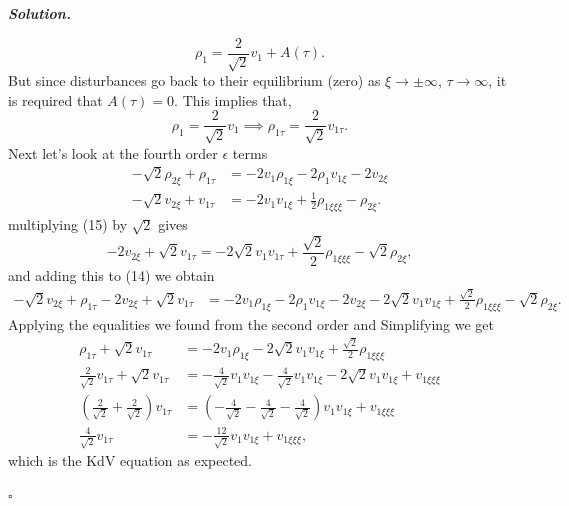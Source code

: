 \documentclass[12pt]{report}
\newenvironment{solution}[1][\it{Solution}]{\textbf{#1. } }{$\square$}
\def\eps{{\epsilon}}
\newcommand{\paren}[1]{{\left(#1\right)}} %
\begin{document}
\begin{solution}
\begin{enumerate}
        \[
            \rho_1 = \frac{2}{\sqrt{2}}v_1 + A(\tau).
        \]
        But since disturbances go back to their equilibrium (zero) as $\xi \to \pm \infty$, $\tau \to \infty$, it is required that $A(\tau) = 0$. This implies that,
        \[
            \rho_1 = \frac{2}{\sqrt{2}} v_1 \implies \rho_{1\tau} = \frac{2}{\sqrt{2}}v_{1\tau}.
        \]
        Next let's look at the fourth order $\eps$ terms
        \begin{align}
            -\sqrt{2}\rho_{2\xi} + \rho_{1\tau} &= -2v_1\rho_{1\xi} - 2\rho_1v_{1\xi} - 2 v_{2\xi}\\
            -\sqrt{2}v_{2\xi} + v_{1\tau} &= -2v_1v_{1\xi} + \frac{1}{2}\rho_{1\xi\xi\xi} - \rho_{2\xi}.
        \end{align}
        multiplying (15) by $\sqrt{2}$ gives
        \[
            -2v_{2\xi} + \sqrt{2}v_{1\tau} = -2\sqrt{2}v_1v_{1\tau} + \frac{\sqrt{2}}{2}\rho_{1\xi\xi\xi} - \sqrt{2}\rho_{2\xi},
         \]
        and adding this to (14) we obtain
        \begin{align*}
            -\sqrt{2}v_{2\xi} + \rho_{1\tau} - 2v_{2\xi} + \sqrt{2}v_{1\tau} &= -2 v_1\rho_{1\xi} - 2\rho_1v_{1\xi} - 2v_{2\xi} -2\sqrt{2}v_1v_{1\xi} + \frac{\sqrt{2}}{2}\rho_{1\xi\xi\xi} - \sqrt{2}\rho_{2\xi}.
        \end{align*}
        Applying the equalities we found from the second order and Simplifying we get
        \begin{align*}
            \rho_{1\tau} + \sqrt{2}v_{1\tau} &= -2v_1\rho_{1\xi} - 2\sqrt{2}v_1v_{1\xi} + \frac{\sqrt{2}}{2}\rho_{1\xi\xi\xi}\\
            \frac{2}{\sqrt{2}}v_{1\tau} + \sqrt{2}v_{1\tau} &= -\frac{4}{\sqrt{2}}v_1v_{1\xi} - \frac{4}{\sqrt{2}}v_1v_{1\xi} - 2\sqrt{2}v_1v_{1\xi} + v_{1\xi\xi\xi}\\
            \paren{\frac{2}{\sqrt{2}}+\frac{2}{\sqrt{2}}}v_{1\tau} &= \paren{-\frac{4}{\sqrt{2}}-\frac{4}{\sqrt{2}}-\frac{4}{\sqrt{2}}}v_1v_{1\xi} + v_{1\xi\xi\xi}\\
            \frac{4}{\sqrt{2}}v_{1\tau} &= -\frac{12}{\sqrt{2}}v_1v_{1\xi} + v_{1\xi\xi\xi},
        \end{align*}
        which is the KdV equation as expected. 

    \end{enumerate}
\end{solution}

\newpage
\end{document}
